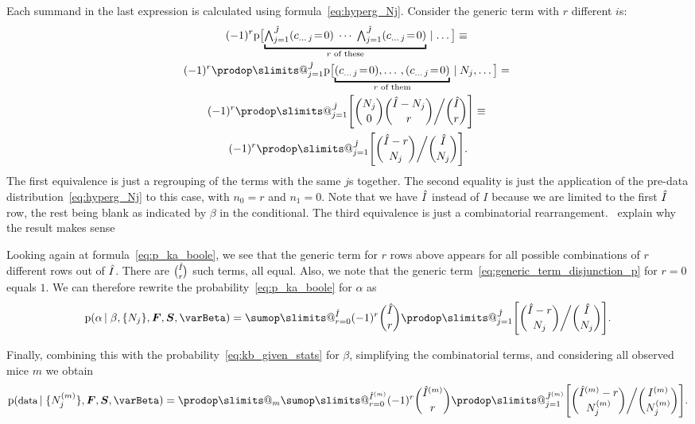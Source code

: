 \documentclass[\ifafour a4paper,12pt,\else a5paper,10pt,\fi%
onecolumn,oneside,article,%
british%
]{memoir}
\makeatletter
\theoremstyle{remark}
\theoremstyle{innote}
\def\sum{\DOTSI\sumop\slimits@}
\def\prod{\DOTSI\prodop\slimits@}
\newcommand*{\pf}{\mathrm{p}}%
\renewcommand*{\|}[1][]{\nonscript\,#1\vert\nonscript\;\mathopen{}}
\newcommand*{\tland}{\mathop{\textstyle\bigwedge}\nolimits}
\newcommand*{\puzzle}{{\fontencoding{U}\fontfamily{fontawesometwo}\selectfont\symbol{225}}}
\newcommand{\mynote}[1]{ {\color{notecolour}\puzzle\ #1}}
\newcommand*{\yI}{\varBeta}
\newcommand*{\eq}{\mathrel{\!=\!}}
\newcommand*{\yF}{\bm{F}}
\newcommand*{\yIm}[1][m]{I^{(#1)}}
\newcommand*{\yNm}[1][m]{N^{(#1)}}
\newcommand*{\ySS}{S}
\newcommand*{\yS}{\bm{\ySS}}
\DeclarePairedDelimiter\tu{\{}{\}}
\newcommand*{\yIhm}[1][m]{\Hat{I}^{(#1)}}
\newcommand*{\yJhm}[1][m]{\Hat{J}^{(#1)}}
\newcommand*{\yIh}{\Hat{I}}
\newcommand*{\yJh}{\Hat{J}}
\newcommand*{\ka}{\alpha}
\newcommand*{\kb}{\beta}
\makeatother
\begin{document}
Each summand in the last expression is calculated using
formula~\eqref{eq:hyperg_Nj}. Consider the generic term with $r$ different $i$s:
\begin{multline}
  \label{eq:generic_term_disjunction_p}
(-1)^{r}  \pf\bigl[
\underbracket{\tland_{j=1}^{\yJh} (c_{\dotso\,j} \eq 0)\;\dotsm\;
  \tland_{j=1}^{\yJh} (c_{\dotso\,j} \eq 0)}_{\text{$r$ of these}}
\|\dotso \bigr] \equiv{}\\
(-1)^{r} \prod_{j=1}^{\yJh}
  \pf\bigl[
\underbracket{(c_{\dotso\,j} \eq 0),\dotso, (c_{\dotso\,j} \eq 0)}_{\text{$r$ of them}}
\|N_{j},\dotso \bigr] ={}\\
(-1)^{r} \prod_{j=1}^{\yJh}\Biggl[
\binom{N_{j}}{0} \binom{\yIh-N_{j}}{r} \bigg/ \binom{\yIh}{r}
\Biggr]
\equiv{}\\
(-1)^{r} \prod_{j=1}^{\yJh}\Biggl[
\binom{\yIh-r}{N_{j}}  \bigg/ \binom{\yIh}{N_{j}}
\Biggr].
\end{multline}
The first equivalence is just a regrouping of the terms with the same $j$s
together. The second equality is just the application of the pre-data
distribution~\eqref{eq:hyperg_Nj} to this case, with $n_{0}=r$ and
$n_{1}=0$. Note that we have $\yIh$ instead of $I$ because we are limited
to the first $\yIh$ row, the rest being blank as indicated by $\kb$ in the
conditional. The third equivalence is just a combinatorial rearrangement.
\mynote{explain why the result makes sense}

Looking again at formula~\eqref{eq:p_ka_boole}, we see that the generic
term for $r$ rows above appears for all possible combinations of $r$
different rows out of $\yIh$. There are $\binom{\yIh}{r}$ such terms, all
equal. Also, we note that the generic
term~\eqref{eq:generic_term_disjunction_p} for $r=0$ equals $1$. We can
therefore rewrite the probability~\eqref{eq:p_ka_boole} for $\ka$ as
\begin{equation}
  \label{eq:final_p_ka_boole}
  \pf( \ka \|\kb, \tu{N_{j}}, \yF, \yS, \yI)
=
\sum_{r=0}^{\yIh}(-1)^{r}\binom{\yIh}{r}
\prod_{j=1}^{\yJh}\Biggl[
\binom{\yIh-r}{N_{j}}  \bigg/ \binom{\yIh}{N_{j}}
\Biggr].
\end{equation}

Finally, combining this with the probability~\eqref{eq:kb_given_stats} for
$\kb$, simplifying the combinatorial terms, and considering all observed
mice $m$ we obtain
\begin{equation}
  \label{eq:prob_data_given_stats}
  \pf( \text{\small data} \|\tu{\yNm_{j}},  \yF, \yS, \yI) =
  \prod_{m}
  \sum_{r=0}^{\yIhm}(-1)^{r}\binom{\yIhm}{r}
\prod_{j=1}^{\yJhm}\Biggl[
\binom{\yIhm-r}{\yNm_{j}}  \bigg/ \binom{\yIm}{\yNm_{j}}
\Biggr].
\end{equation}
\end{document}
